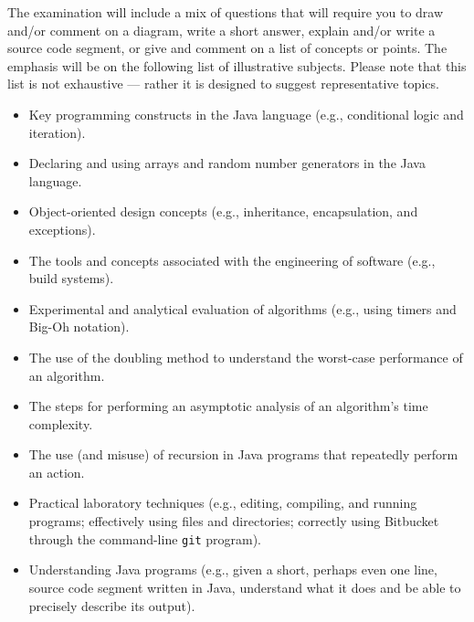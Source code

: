 \noindent The examination will include a mix of questions that will require you to draw and/or comment on a diagram,
write a short answer, explain and/or write a source code segment, or give and comment on a list of concepts or points.
The emphasis will be on the following list of illustrative subjects. Please note that this list is not exhaustive ---
rather it is designed to suggest representative topics.

\vspace*{-.05in}
\begin{itemize}

  \itemsep 0in

  \item Key programming constructs in the Java language (e.g., conditional logic and iteration).

  \item Declaring and using arrays and random number generators in the Java language.

  \item Object-oriented design concepts (e.g., inheritance, encapsulation, and exceptions).

  \item The tools and concepts associated with the engineering of software (e.g., build systems).

  \item Experimental and analytical evaluation of algorithms (e.g., using timers and Big-Oh notation).

  \item The use of the doubling method to understand the worst-case performance of an algorithm.

  \item The steps for performing an asymptotic analysis of an algorithm's time complexity.


  \item The use (and misuse) of recursion in Java programs that repeatedly perform an action.

  \item Practical laboratory techniques (e.g., editing, compiling, and running programs; effectively using files and
    directories; correctly using Bitbucket through the command-line {\tt git} program).

  \item Understanding Java programs (e.g., given a short, perhaps even one line, source code segment written in Java,
    understand what it does and be able to precisely describe its output).


\end{itemize}

